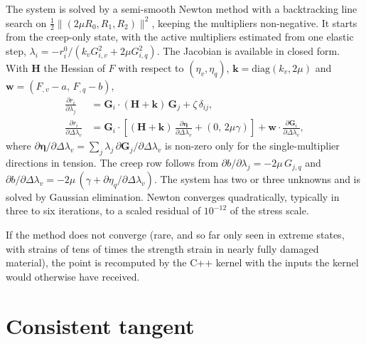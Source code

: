 \documentclass[11pt,a4paper]{article}
\newcommand{\bfeta}{\bm{\eta}}
\newcommand{\bG}{\bm{G}}
\begin{document}
The system is solved by a semi-smooth Newton method with a backtracking line search on
$\tfrac12\|(2\mu R_0,R_1,R_2)\|^2$, keeping the multipliers non-negative. It starts from the
creep-only state, with the active multipliers estimated from one elastic step,
$\lambda_i=-r_i^0/(k_vG_{i,v}^2+2\mu G_{i,q}^2)$. The Jacobian is available in closed form.
With $\bm{H}$ the Hessian of $F$ with respect to $(\eta_v,\eta_q)$,
$\bm{k}=\mathrm{diag}(k_v,2\mu)$ and $\bm{w}=(F_{,v}-a,\,F_{,q}-b)$,
\begin{align}
  \frac{\partial r_i}{\partial\lambda_j}&=\bG_i\cdot(\bm{H}+\bm{k})\,\bG_j+\zeta\,\delta_{ij},\\
  \frac{\partial r_i}{\partial\Delta\lambda_v}&=\bG_i\cdot\left[(\bm{H}+\bm{k})\,\frac{\partial\bfeta}{\partial\Delta\lambda_v}+(0,\,2\mu\gamma)\right]+\bm{w}\cdot\frac{\partial\bG_i}{\partial\Delta\lambda_v},
\end{align}
where $\partial\bfeta/\partial\Delta\lambda_v=\sum_j\lambda_j\,\partial\bG_j/\partial\Delta\lambda_v$
is non-zero only for the single-multiplier directions in tension. The creep row follows from
$\partial b/\partial\lambda_j=-2\mu\,G_{j,q}$ and
$\partial b/\partial\Delta\lambda_v=-2\mu\,(\gamma+\partial\eta_q/\partial\Delta\lambda_v)$.
The system has two or three unknowns and is solved by Gaussian elimination. Newton converges
quadratically, typically in three to six iterations, to a scaled residual of $10^{-12}$ of the
stress scale.

If the method does not converge (rare, and so far only seen in extreme states, with strains of
tens of times the strength strain in nearly fully damaged material), the point is recomputed by
the C++ kernel with the inputs the kernel would otherwise have received.

\section{Consistent tangent}
\end{document}
